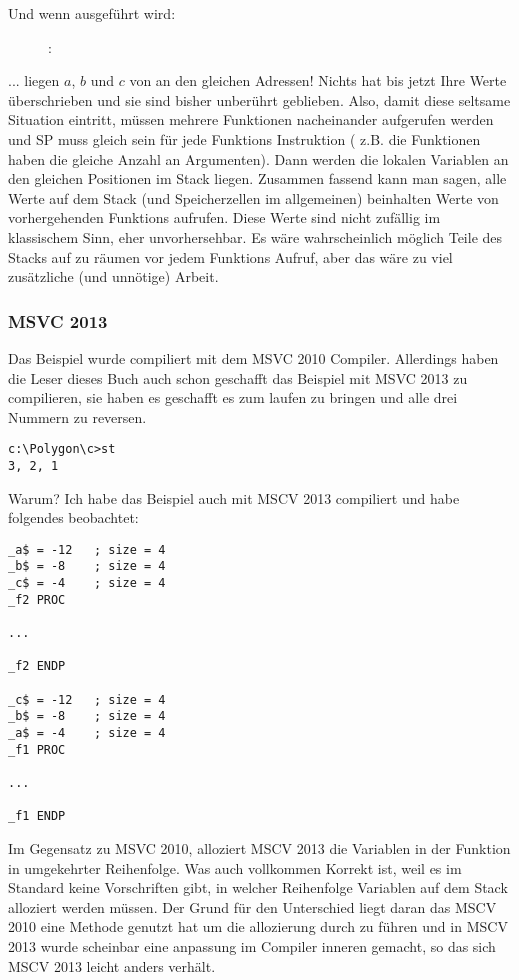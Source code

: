 \clearpage
Und wenn  ausgeführt wird:

\begin{figure}[H]
\centering
{}
\caption{\olly: }
\label{fig:stack_noise_olly2}
\end{figure}

... liegen $a$, $b$ und $c$ von   an den gleichen Adressen!
Nichts hat bis jetzt Ihre Werte überschrieben und sie sind bisher
unberührt geblieben. Also, damit diese seltsame Situation eintritt, müssen
mehrere Funktionen nacheinander aufgerufen werden und \ac{SP} muss gleich 
sein für jede Funktions Instruktion ( z.B. die Funktionen haben die 
gleiche Anzahl an Argumenten). Dann werden die lokalen Variablen an den
gleichen Positionen im Stack liegen. Zusammen fassend kann man sagen, alle
Werte auf dem Stack (und Speicherzellen im allgemeinen) beinhalten Werte
von vorhergehenden Funktions aufrufen. Diese Werte sind nicht zufällig 
im klassischem Sinn, eher unvorhersehbar. Es wäre wahrscheinlich möglich 
Teile des Stacks auf zu räumen vor jedem Funktions Aufruf, aber das wäre
zu viel zusätzliche (und unnötige) Arbeit. 

\subsubsection{MSVC 2013}

Das Beispiel wurde compiliert mit dem MSVC 2010 Compiler.
Allerdings haben die Leser dieses Buch auch schon geschafft das Beispiel mit MSVC 2013 zu compilieren, sie haben es geschafft es zum laufen zu bringen und alle drei Nummern zu reversen.

\begin{lstlisting}
c:\Polygon\c>st
3, 2, 1
\end{lstlisting}

Warum? 
Ich habe das Beispiel auch mit MSCV 2013 compiliert und habe folgendes beobachtet:

\begin{lstlisting}[caption=MSVC 2013]
_a$ = -12	; size = 4
_b$ = -8	; size = 4
_c$ = -4	; size = 4
_f2	PROC

...

_f2	ENDP

_c$ = -12	; size = 4
_b$ = -8	; size = 4
_a$ = -4	; size = 4
_f1	PROC

...

_f1	ENDP
\end{lstlisting}

Im Gegensatz zu MSVC 2010, alloziert MSCV 2013 die Variablen in der Funktion  in umgekehrter Reihenfolge.%
Was auch vollkommen Korrekt ist, weil es im \CCpp Standard keine Vorschriften gibt, in welcher Reihenfolge Variablen auf dem Stack alloziert werden müssen. Der Grund für den Unterschied liegt daran das MSCV 2010 eine Methode genutzt hat um  die allozierung durch zu führen und in MSCV 2013 wurde scheinbar eine anpassung im Compiler inneren gemacht, so das sich MSCV 2013 leicht anders verhält.

